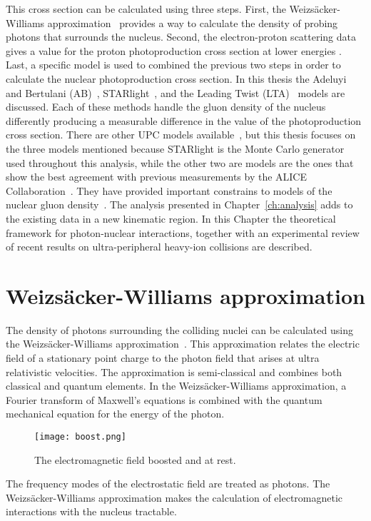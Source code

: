     This cross section can be calculated using three steps.   
    First, the Weizs\"{a}cker-Williams approximation~\cite{vonWeizsacker:1934sx,Williams:1934ad} provides a way to calculate the 
      density of probing photons that surrounds the nucleus. 
    Second, the electron-proton scattering data gives a value for the proton 
      photoproduction cross section at lower energies \cite{Klasen:2007pm}.
    Last, a specific model is used to combined the previous two steps in order
      to calculate the nuclear photoproduction cross section. 
    In this thesis the Adeluyi and Bertulani (AB)~\cite{pQCD2011.08,pQCD2013.02}, STARlight~\cite{vmd1999,starlight}, and 
      the Leading Twist (LTA)~\cite{Frankfurt:2011cs,lta2011.09} models are discussed. 
    Each of these methods handle the gluon density of the nucleus differently 
      producing a measurable difference in the value of the \JPsi{} 
      photoproduction cross section. There are other UPC models available~\cite{Goncalves:2011vf,Cisek:2012yt,Lappi:2013am,Hufner:1996jw}, but this thesis focuses on the three models mentioned because 
STARlight is the Monte Carlo generator used throughout this analysis, while the other two are models are the ones that show the best agreement 
with previous measurements by the ALICE Collaboration~\cite{Abelev:2012ba,Abbas:2013oua}. 
They have provided important constrains to models of the nuclear gluon density~\cite{lta2013.05}.
    The analysis presented in Chapter~\ref{ch:analysis} adds to the existing 
      data in a new kinematic region.
    In this Chapter the theoretical framework for photon-nuclear
      interactions, together with an experimental review of recent results on 
      ultra-peripheral heavy-ion collisions are described. 

  \section{Weizs\"{a}cker-Williams approximation \label{sec:wwAprox}}
    The density of photons surrounding the colliding nuclei can be calculated 
      using the Weizs\"{a}cker-Williams approximation~\cite{vonWeizsacker:1934sx,Williams:1934ad}. 
    This approximation relates the electric field of a stationary point charge 
      to the photon field that arises at ultra relativistic velocities. 
    The approximation is semi-classical and combines both classical and quantum 
      elements.
    In the Weizs\"{a}cker-Williams 
      approximation, a Fourier transform of Maxwell's equations is combined 
      with the quantum mechanical equation for the energy of the photon.   
    \begin{figure}[!Hhbt]
      \begin{center}
        \texttt{[image: boost.png]}
      \end{center}
      \caption{ \label{fig:boost} The electromagnetic field boosted and at rest. }
    \end{figure}
    The frequency modes of the electrostatic field are treated as photons. 
    The Weizs\"{a}cker-Williams approximation makes the calculation of 
      electromagnetic interactions with the nucleus tractable. 

